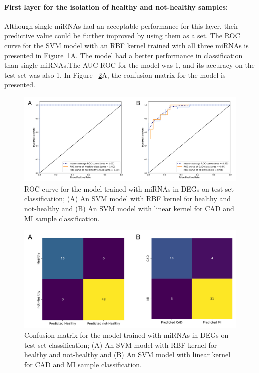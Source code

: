 \documentclass[sn-mathphys,Numbered]{sn-jnl}%
\theoremstyle{thmstyleone}%
\theoremstyle{thmstyletwo}%
\theoremstyle{thmstylethree}%
\begin{document}
\paragraph{First layer for the isolation of healthy and not-healthy
samples:}\label{first-layer-for-the-isolation-of-healthy-and-not-healthy-samples-2}

Although single miRNAs had an acceptable performance for this layer,
their predictive value could be further improved by using them as a set.
The ROC curve for the SVM model with an RBF kernel trained with all
three miRNAs is presented in Figure~\ref{fig:DEMROC}A. The model had a
better performance in classification than single miRNAs.The AUC-ROC for
the model was 1, and its accuracy on the test set was also 1. In Figure
~\ref{fig:DEMCF}A, the confusion matrix for the model is presented.

\begin{figure}
\centering 
\includegraphics[width=0.95\linewidth]{DEMs ROCs h not h cad mi}
\caption{ROC curve for the model trained with miRNAs in DEGs on test set classification; (A) An SVM model with RBF kernel for healthy and not-healthy and (B) An SVM model with linear kernel for CAD and MI sample classification.}\label{fig:DEMROC}
\end{figure}

\begin{figure}
\centering 
\includegraphics[width=0.9\linewidth]{DEMs Conf. matrix}
\caption{Confusion matrix for the model trained with miRNAs in DEGs on test set classification; (A) An SVM model with RBF kernel for healthy and not-healthy and (B) An SVM model with linear kernel for CAD and MI sample classification.}\label{fig:DEMCF}
\end{figure}
\end{document}
